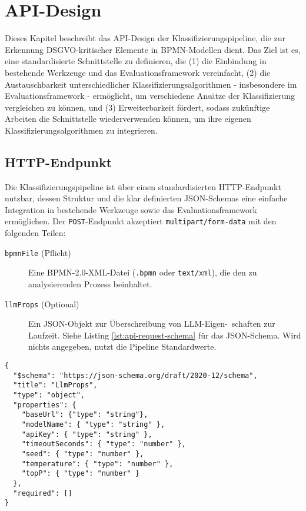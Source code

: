 \section{API-Design}\label{sec:api-design}

Dieses Kapitel beschreibt das API-Design der Klassifizierungspipeline, die zur Erkennung \ac{DSGVO}-kritischer Elemente in \ac{BPMN}-Modellen dient. Das Ziel ist es, eine standardisierte Schnittstelle zu definieren, die (1) die Einbindung in bestehende Werkzeuge und das Evaluationsframework vereinfacht, (2) die Austauschbarkeit unterschiedlicher Klassifizierungsalgorithmen - insbesondere im Evaluationsframework - ermöglicht, um verschiedene Ansätze der Klassifizierung vergleichen zu können, und (3) Erweiterbarkeit fördert, sodass zukünftige Arbeiten die Schnittstelle wiederverwenden können, um ihre eigenen Klassifizierungsalgorithmen zu integrieren.

\subsection*{HTTP-Endpunkt}

Die Klassifizierungspipeline ist über einen standardisierten HTTP-Endpunkt nutzbar, dessen Struktur und die klar definierten JSON-Schemas eine einfache Integration in bestehende Werkzeuge sowie das Evaluationsframework ermöglichen. Der \texttt{POST}-Endpunkt akzeptiert \texttt{multipart/form-data} mit den folgenden Teilen:

\begin{description}
    \item[\texttt{bpmnFile} (Pflicht)] Eine BPMN-2.0-XML-Datei (\texttt{.bpmn} oder \texttt{text/xml}), die den zu analysierenden Prozess beinhaltet.
    \item[\texttt{llmProps} (Optional)] Ein JSON-Objekt zur Überschreibung von \ac{LLM}-Eigen-\linebreak~schaften zur Laufzeit. Siehe Listing \ref{lst:api-request-schema} für das JSON-Schema. Wird nichts angegeben, nutzt die Pipeline Standardwerte.
\end{description}

\begin{lstlisting}[caption={JSON-Schema der \texttt{llmProps}.},label={lst:api-request-schema}]
{
  "$schema": "https://json-schema.org/draft/2020-12/schema",
  "title": "LlmProps",
  "type": "object",
  "properties": {
    "baseUrl": {"type": "string"},
    "modelName": { "type": "string" },
    "apiKey": { "type": "string" },
    "timeoutSeconds": { "type": "number" },
    "seed": { "type": "number" },
    "temperature": { "type": "number" },
    "topP": { "type": "number" }
  },
  "required": []
}
\end{lstlisting}


